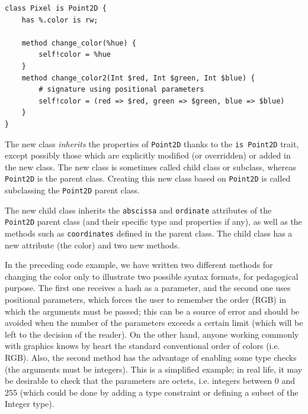 \begin{verbatim}
class Pixel is Point2D {
    has %.color is rw;

    method change_color(%hue) {
        self!color = %hue
    }
    method change_color2(Int $red, Int $green, Int $blue) {
        # signature using positional parameters
        self!color = (red => $red, green => $green, blue => $blue)
    }
}
\end{verbatim}

The new class \emph{inherits} the properties of {\tt Point2D} 
thanks to the {\tt is Point2D} trait, except possibly those 
which are explicitly modified (or overridden) or added in 
the new class. The new class is sometimes 
called child class or subclass, whereas {\tt Point2D} is the 
parent class. Creating this new class based on 
{\tt Point2D} is called subclassing the {\tt Point2D} 
parent class. 

The new child class inherits the {\tt abscissa} and 
{\tt ordinate} attributes of the {\tt Point2D} parent 
class (and their specific type and properties if any), 
as well as the methods such as {\tt coordinates} defined 
in the parent class. The child class  has a new 
attribute (the color) and two new methods.

In the preceding code example, we have written two different 
methods for changing the color 
only to illustrate two possible syntax formats, for pedagogical 
purpose. The first one receives a hash as a parameter, and 
the second one uses positional parameters, which forces 
the user to remember the order (RGB) in which the arguments must 
be passed; this can be a source of error and should be avoided 
when the number of the parameters exceeds a certain limit 
(which will be left to the decision of the reader). On the other 
hand, anyone working commonly with graphics knows by heart the 
standard conventional order of colors (i.e. RGB). Also, 
the second method has the 
advantage of enabling some type checks (the arguments must 
be integers). This is a simplified example; in real life, it 
may be desirable to check that the parameters are octets, i.e. 
integers between 0 and 255 (which could be done by adding a 
type constraint or defining a subset of the Integer type).

